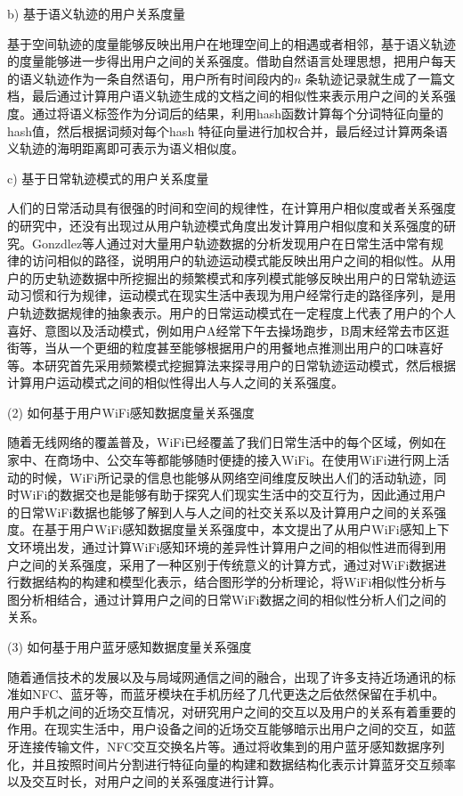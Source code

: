 \par b) 基于语义轨迹的用户关系度量
\par 基于空间轨迹的度量能够反映出用户在地理空间上的相遇或者相邻，基于语义轨迹的度量能够进一步得出用户之间的关系强度。借助自然语言处理思想，把用户每天的语义轨迹作为一条自然语句，用户所有时间段内的$n$ 条轨迹记录就生成了一篇文档，最后通过计算用户语义轨迹生成的文档之间的相似性来表示用户之间的关系强度。通过将语义标签作为分词后的结果，利用hash函数计算每个分词特征向量的hash值，然后根据词频对每个hash 特征向量进行加权合并，最后经过计算两条语义轨迹的海明距离即可表示为语义相似度。%
\par c) 基于日常轨迹模式的用户关系度量
\par 人们的日常活动具有很强的时间和空间的规律性，在计算用户相似度或者关系强度的研究中，还没有出现过从用户轨迹模式角度出发计算用户相似度和关系强度的研究。Gonzdlez等人通过对大量用户轨迹数据的分析发现用户在日常生活中常有规律的访问相似的路径，说明用户的轨迹运动模式能反映出用户之间的相似性。从用户的历史轨迹数据中所挖掘出的频繁模式和序列模式能够反映出用户的日常轨迹运动习惯和行为规律，运动模式在现实生活中表现为用户经常行走的路径序列，是用户轨迹数据规律的抽象表示。用户的日常运动模式在一定程度上代表了用户的个人喜好、意图以及活动模式，例如用户A经常下午去操场跑步，B周末经常去市区逛街等，当从一个更细的粒度甚至能够根据用户的用餐地点推测出用户的口味喜好等。本研究首先采用频繁模式挖掘算法来探寻用户的日常轨迹运动模式，然后根据计算用户运动模式之间的相似性得出人与人之间的关系强度。
\par (2) 如何基于用户WiFi感知数据度量关系强度
\par 随着无线网络的覆盖普及，WiFi已经覆盖了我们日常生活中的每个区域，例如在家中、在商场中、公交车等都能够随时便捷的接入WiFi。在使用WiFi进行网上活动的时候，WiFi所记录的信息也能够从网络空间维度反映出人们的活动轨迹，同时WiFi的数据交也是能够有助于探究人们现实生活中的交互行为，因此通过用户的日常WiFi数据也能够了解到人与人之间的社交关系以及计算用户之间的关系强度。在基于用户WiFi感知数据度量关系强度中，本文提出了从用户WiFi感知上下文环境出发，通过计算WiFi感知环境的差异性计算用户之间的相似性进而得到用户之间的关系强度，采用了一种区别于传统意义的计算方式，通过对WiFi数据进行数据结构的构建和模型化表示，结合图形学的分析理论，将WiFi相似性分析与图分析相结合，通过计算用户之间的日常WiFi数据之间的相似性分析人们之间的关系。
\par (3) 如何基于用户蓝牙感知数据度量关系强度
\par 随着通信技术的发展以及与局域网通信之间的融合，出现了许多支持近场通讯的标准如NFC、蓝牙等，而蓝牙模块在手机历经了几代更迭之后依然保留在手机中。用户手机之间的近场交互情况，对研究用户之间的交互以及用户的关系有着重要的作用。在现实生活中，用户设备之间的近场交互能够暗示出用户之间的交互，如蓝牙连接传输文件，NFC交互交换名片等。通过将收集到的用户蓝牙感知数据序列化，并且按照时间片分割进行特征向量的构建和数据结构化表示计算蓝牙交互频率以及交互时长，对用户之间的关系强度进行计算。
